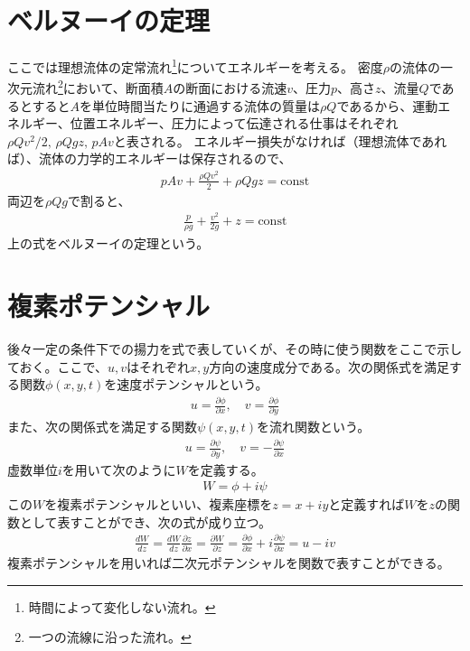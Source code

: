 \documentclass[10pt,b5paper,papersize,dvipdfmx]{jsbook}
\begin{document}
\section{ベルヌーイの定理}
ここでは理想流体の定常流れ\footnote{時間によって変化しない流れ。}についてエネルギーを考える。
密度$\rho$の流体の一次元流れ\footnote{一つの流線に沿った流れ。}において、断面積$A$の断面における流速$v$、圧力$p$、高さ$z$、流量$Q$であるとすると$A$を単位時間当たりに通過する流体の質量は$\rho Q$であるから、運動エネルギー、位置エネルギー、圧力によって伝達される仕事はそれぞれ$\rho Qv^2/2,\, \rho Qgz,\, pAv$と表される。
エネルギー損失がなければ（理想流体であれば）、流体の力学的エネルギーは保存されるので、
\begin{align}
  pAv + \frac{\rho Qv^2}{2} + \rho Qgz = \text{const}
\end{align}
両辺を$\rho Qg$で割ると、
\begin{align}
  \frac{p}{\rho g} + \frac{v^2}{2g} + z = \text{const}
\end{align}
上の式をベルヌーイの定理という。
\section{複素ポテンシャル}
後々一定の条件下での揚力を式で表していくが、その時に使う関数をここで示しておく。ここで、$u, v$はそれぞれ$x, y$方向の速度成分である。次の関係式を満足する関数$\phi(x,y,t)$を速度ポテンシャルという。
\begin{align}
  u = \frac{\partial\phi}{\partial x},\quad
  v = \frac{\partial\phi}{\partial y}
\end{align}
また、次の関係式を満足する関数$\psi(x,y,t)$を流れ関数という。
\begin{align}
  u = \frac{\partial\psi}{\partial y},\quad
  v = -\frac{\partial\psi}{\partial x}
\end{align}
虚数単位$i$を用いて次のように$W$を定義する。
\begin{align}
  W = \phi+i\psi
\end{align}
この$W$を複素ポテンシャルといい、複素座標を$z = x+iy$と定義すれば$W$を$z$の関数として表すことができ、次の式が成り立つ。
\begin{align}
  \frac{dW}{dz}
  = \frac{dW}{dz} \frac{\partial z}{\partial x}
  = \frac{\partial W}{\partial z}
  = \frac{\partial\phi}{\partial x} + i\frac{\partial\psi}{\partial x}
  = u - iv
\end{align}
複素ポテンシャルを用いれば二次元ポテンシャルを関数で表すことができる。
\end{document}
